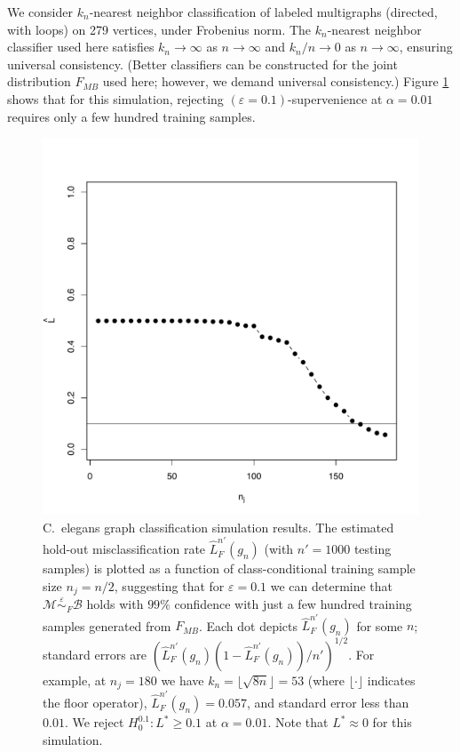 \documentclass{article}
\newcommand{\mB}{\mathcal{B}}
\newcommand{\mM}{\mathcal{M}}
\newcommand{\PP}{\mathbb{P}}           %
\newcommand{\eps}{\varepsilon}
\providecommand{\mt}[1]{\widetilde{#1}}
\newcommand{\hL}{\widehat{L}}
\newcommand{\MeB}{\mM \overset{\varepsilon}{{\sim}}_{F} \mB}
\begin{document}

We consider $k_n$-nearest neighbor classification of labeled multigraphs (directed, with loops) on 279 vertices, under Frobenius norm. The $k_n$-nearest neighbor classifier used here satisfies $k_n \rightarrow \infty$ as $n \rightarrow \infty$ and $k_n/n \rightarrow 0$ as $n \rightarrow \infty$, ensuring universal consistency. (Better classifiers can be constructed for the joint distribution $F_{MB}$ used here; however, we demand universal consistency.)  Figure \ref{fig:1} shows that for this simulation, rejecting $(\eps=0.1)$-supervenience at $\alpha=0.01$ requires only a few hundred training samples.





\begin{figure}[!ht]
\centering 
\includegraphics[width=.5\linewidth]{Lhatplot}
\caption{C.~elegans graph classification simulation results.  The estimated hold-out misclassification rate $\hL^{n'}_{F}(g_{n})$  (with $n'=1000$ testing samples) %
is plotted as a function of class-conditional training sample size $n_j=n/2$, suggesting that for $\varepsilon=0.1$ we can determine that $\MeB$ holds with $99\%$ confidence with just a few hundred training samples generated from $F_{MB}$. Each dot depicts $\hL^{n'}_{F}(g_n)$ for some $n$; standard errors are $(\hL^{n'}_{F}(g_{n}) (1-\hL^{n'}_{F}(g_{n}))/n')^{1/2}$.  For example, at $n_j = 180$ we have $k_n = \lfloor\sqrt{8 n}\rfloor=53$ (where $\lfloor\cdot\rfloor$ indicates the floor operator), $\hL^{n'}_{F}(g_{n}) = 0.057$, and standard error less than $0.01$. We reject $H_0^{0.1}: L^* \geq 0.1$ at $\alpha=0.01$. Note that $L^* \approx 0$ for this simulation.}
\label{fig:1}
\end{figure}
\end{document}
